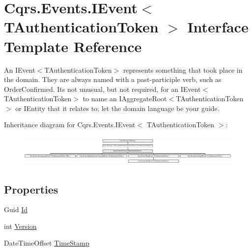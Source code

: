 \hypertarget{interfaceCqrs_1_1Events_1_1IEvent}{}\section{Cqrs.\+Events.\+I\+Event$<$ T\+Authentication\+Token $>$ Interface Template Reference}
\label{interfaceCqrs_1_1Events_1_1IEvent}


An I\+Event$<$\+T\+Authentication\+Token$>$ represents something that took place in the domain. They are always named with a past-\/participle verb, such as Order\+Confirmed. It\textquotesingle{}s not unusual, but not required, for an I\+Event$<$\+T\+Authentication\+Token$>$ to name an I\+Aggregate\+Root$<$\+T\+Authentication\+Token$>$ or I\+Entity that it relates to; let the domain language be your guide.  


Inheritance diagram for Cqrs.\+Events.\+I\+Event$<$ T\+Authentication\+Token $>$\+:\begin{figure}[H]
\begin{center}
\leavevmode
\includegraphics[height=1.548672cm]{interfaceCqrs_1_1Events_1_1IEvent}
\end{center}
\end{figure}
\subsection*{Properties}
\begin{DoxyCompactItemize}
\item 
Guid \hyperlink{interfaceCqrs_1_1Events_1_1IEvent_a2974e13d307c62c5cc438d668ff1783b}{Id}
\item 
int \hyperlink{interfaceCqrs_1_1Events_1_1IEvent_a2754e056f483b9a8e59622a363276b15}{Version}
\item 
Date\+Time\+Offset \hyperlink{interfaceCqrs_1_1Events_1_1IEvent_a149d6ea1652cbcc63dbc45eaa71fade0}{Time\+Stamp}
\end{DoxyCompactItemize}


